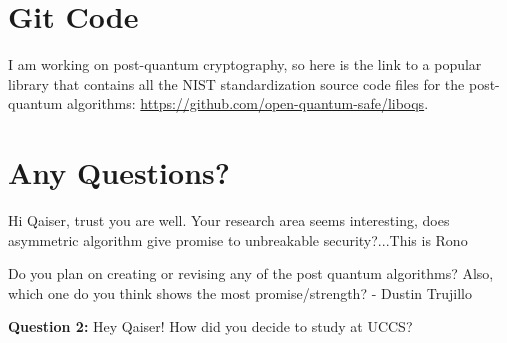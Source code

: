 \section{Git Code}
I am working on post-quantum cryptography, so here is the link to a popular library that contains all the NIST standardization source code files for the post-quantum algorithms:
\href{https://github.com/open-quantum-safe/liboqs}{https://github.com/open-quantum-safe/liboqs}.

\section{Any Questions?}


Hi Qaiser, trust you are well.
Your research area seems interesting, does asymmetric algorithm give promise to unbreakable security?...This is Rono
%

Do you plan on creating or revising any of the post quantum algorithms? Also, which one do you think shows the most promise/strength? - Dustin Trujillo 

\textbf{Question 2:} Hey Qaiser! How did you decide to study at UCCS?



%
%
